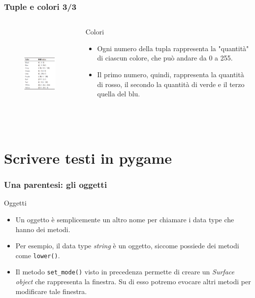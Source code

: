 \documentclass{beamer}
\begin{document}
\begin{frame}[fragile]
\frametitle{Tuple e colori 3/3}
\begin{columns}[T]
	\begin{column}[T]{0.55\textwidth}
		\begin{figure}[t]
			\includegraphics[height=5cm, width=6cm]{images/TabellaColori.png}
		\end{figure}
	\end{column}
	\begin{column}[T]{0.45\textwidth}
		\begin{block}{Colori}
			\begin{itemize}
				\item Ogni numero della tupla rappresenta la "quantità" di ciascun colore, che può andare da 0 a 255.
				\item Il primo numero, quindi, rappresenta la quantità di rosso, il secondo la quantità di verde e il terzo quella del blu.
			\end{itemize}
		\end{block}
	\end{column}
\end{columns}
\end{frame}

\section{Scrivere testi in pygame}

\begin{frame}[fragile]
\frametitle{Una parentesi: gli oggetti}
\begin{block}{Oggetti}
	\begin{itemize}
		\item Un oggetto è semplicemente un altro nome per chiamare i data type che hanno dei metodi.
		\item Per esempio, il data type \textit{string} è un oggetto, siccome  possiede dei metodi come \texttt{lower()}.
		\item Il metodo \texttt{set\_mode()} visto in precedenza permette di creare un \textit{Surface object} che rappresenta la finestra. Su di esso potremo evocare altri metodi per modificare tale finestra.
	\end{itemize}
\end{block}
\end{frame}
\end{document}
